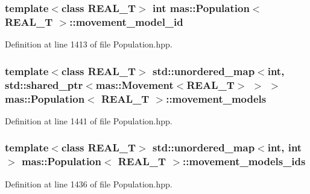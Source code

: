 \hypertarget{classmas_1_1_population_a445c1fbf6d76206a93b243f7e39b8279}{
\subsubsection[{movement\-\_\-model\-\_\-id}]{\setlength{\rightskip}{0pt plus 5cm}template$<$class R\-E\-A\-L\-\_\-\-T$>$ int {\bf mas\-::\-Population}$<$ R\-E\-A\-L\-\_\-\-T $>$\-::movement\-\_\-model\-\_\-id}}\label{classmas_1_1_population_a445c1fbf6d76206a93b243f7e39b8279}


Definition at line 1413 of file Population.\-hpp.

\hypertarget{classmas_1_1_population_ae53093b412fcb3c074a90fccdfc747fe}{
\subsubsection[{movement\-\_\-models}]{\setlength{\rightskip}{0pt plus 5cm}template$<$class R\-E\-A\-L\-\_\-\-T$>$ std\-::unordered\-\_\-map$<$int, std\-::shared\-\_\-ptr$<${\bf mas\-::\-Movement}$<$R\-E\-A\-L\-\_\-\-T$>$ $>$ $>$ {\bf mas\-::\-Population}$<$ R\-E\-A\-L\-\_\-\-T $>$\-::movement\-\_\-models}}\label{classmas_1_1_population_ae53093b412fcb3c074a90fccdfc747fe}


Definition at line 1441 of file Population.\-hpp.

\hypertarget{classmas_1_1_population_ab98ba8e32dbc1650b3452adaa6bd09e1}{
\subsubsection[{movement\-\_\-models\-\_\-ids}]{\setlength{\rightskip}{0pt plus 5cm}template$<$class R\-E\-A\-L\-\_\-\-T$>$ std\-::unordered\-\_\-map$<$int, int $>$ {\bf mas\-::\-Population}$<$ R\-E\-A\-L\-\_\-\-T $>$\-::movement\-\_\-models\-\_\-ids}}\label{classmas_1_1_population_ab98ba8e32dbc1650b3452adaa6bd09e1}


Definition at line 1436 of file Population.\-hpp.


